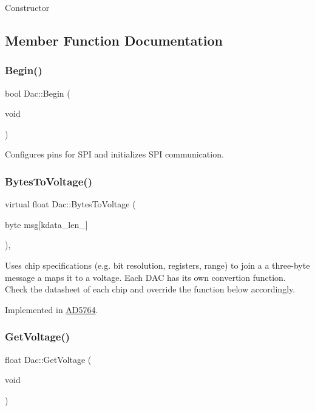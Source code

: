 Constructor 

\subsection{Member Function Documentation}
\mbox{\label{classDac_ad88e0048e59c0633b72769ddb8337e49}} 
\subsubsection{\texorpdfstring{Begin()}{Begin()}}
{\footnotesize\ttfamily bool Dac\+::\+Begin (\begin{DoxyParamCaption}\item[{void}]{ }\end{DoxyParamCaption})}

Configures pins for S\+PI and initializes S\+PI communication. \mbox{\label{classDac_a1dc9be97cb41ddacbd8dde0c5d4243b4}} 
\subsubsection{\texorpdfstring{Bytes\+To\+Voltage()}{BytesToVoltage()}}
{\footnotesize\ttfamily virtual float Dac\+::\+Bytes\+To\+Voltage (\begin{DoxyParamCaption}\item[{byte}]{msg\mbox{[}kdata\+\_\+len\+\_\+\mbox{]} }\end{DoxyParamCaption})\hspace{0.3cm}{\ttfamily [protected]}, {}}

Uses chip specifications (e.\+g. bit resolution, registers, range) to join a a three-\/byte message a maps it to a voltage. Each D\+AC has its own convertion function. Check the datasheet of each chip and override the function below accordingly. 

Implemented in \mbox{\hyperlink{classAD5764_a8f2845c7dd6b8984e7b85c35e50bbb66}{A\+D5764}}.

\mbox{\label{classDac_afad6313ba5c58c10efde3849c7f89d2e}} 
\subsubsection{\texorpdfstring{Get\+Voltage()}{GetVoltage()}}
{\footnotesize\ttfamily float Dac\+::\+Get\+Voltage (\begin{DoxyParamCaption}\item[{void}]{ }\end{DoxyParamCaption})}

